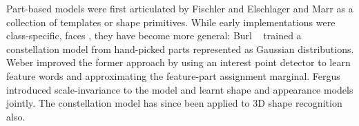Part-based models were first articulated by Fischler and Elschlager \cite{Fischler1973} and Marr \cite{Marr1982} as a collection of templates or shape primitives. While early implementations were class-specific, \eg faces \cite{Yuille1989}, they have become more general: Burl \etal~\cite{Burl1998} trained a constellation model from hand-picked parts represented as Gaussian distributions. Weber \etal \cite{Weber2000} improved the former approach by using an interest point detector \cite{Kadir2001} to learn feature words and approximating the feature-part assignment marginal. Fergus \etal \cite{Fergus2007} introduced scale-invariance to the model and learnt shape and appearance models jointly. 
The constellation model has since been applied to 3D shape recognition~\cite{MuktaPrasad2011} also.


